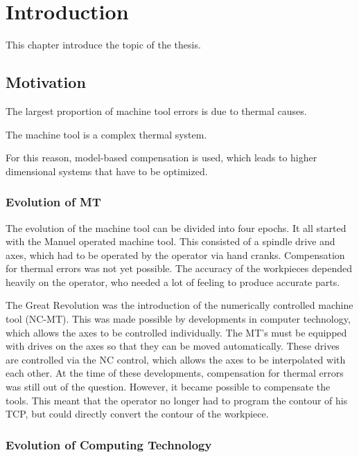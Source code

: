 \setcounter{chapter}{0}

\chapter{Introduction}
\label{sec:introduction}

This chapter introduce the topic of the thesis.

\section{Motivation}
\label{sec:motivation}

The largest proportion of machine tool errors is due to thermal causes.

The machine tool is a complex thermal system.

For this reason, model-based compensation is used, which leads to higher dimensional systems that have to be optimized.

\subsection{Evolution of MT}
\label{sec:evolution_mt}

The evolution of the machine tool can be divided into four epochs. It all started with the Manuel operated machine tool. This consisted of a spindle drive and axes, which had to be operated by the operator via hand cranks. Compensation for thermal errors was not yet possible. The accuracy of the workpieces depended heavily on the operator, who needed a lot of feeling to produce accurate parts. 

The Great Revolution was the introduction of the numerically controlled machine tool (NC-MT). This was made possible by developments in computer technology, which allows the axes to be controlled individually. The MT's must be equipped with drives on the axes so that they can be moved automatically. These drives are controlled via the NC control, which allows the axes to be interpolated with each other. At the time of these developments, compensation for thermal errors was still out of the question. However, it became possible to compensate the tools. This meant that the operator no longer had to program the contour of his TCP, but could directly convert the contour of the workpiece. 

\subsection{Evolution of Computing Technology}
\label{sec:evolution_computer}

